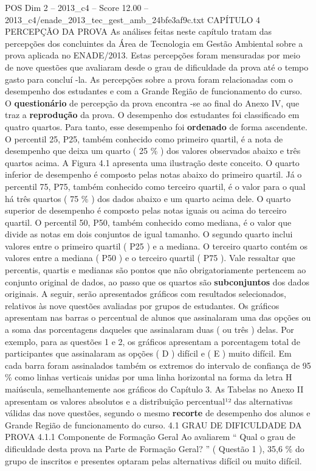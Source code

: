 \begin{textsample}{POS Dim 2 – 2013\_c4 – Score 12.00 – 2013\_c4/enade\_2013\_tec\_gest\_amb\_24bfe3af9c.txt}  \label{ex:f2_pos_067}
CAPÍTULO 4 PERCEPÇÃO DA PROVA As análises feitas neste capítulo tratam das percepções dos concluintes da Área de Tecnologia em Gestão Ambiental sobre a prova aplicada no ENADE/2013.
Estas percepções foram mensuradas por meio de nove questões que avaliaram desde o grau de dificuldade da prova até o tempo gasto para concluí -la.
As percepções sobre a prova foram relacionadas com o desempenho dos estudantes e com a Grande Região de funcionamento do curso.
O \textbf{questionário} de percepção da prova encontra -se ao final do Anexo IV, que traz a \textbf{reprodução} da prova.
O desempenho dos estudantes foi classificado em quatro quartos.
Para tanto, esse desempenho foi \textbf{ordenado} de forma ascendente.
O percentil 25, P25, também conhecido como primeiro quartil, é a nota de desempenho que deixa um quarto ( 25 \% ) dos valores observados abaixo e três quartos acima.
A Figura 4.1 apresenta uma ilustração deste conceito.
O quarto inferior de desempenho é composto pelas notas abaixo do primeiro quartil.
Já o percentil 75, P75, também conhecido como terceiro quartil, é o valor para o qual há três quartos ( 75 \% ) dos dados abaixo e um quarto acima dele.
O quarto superior de desempenho é composto pelas notas iguais ou acima do terceiro quartil.
O percentil 50, P50, também conhecido como mediana, é o valor que divide as notas em dois conjuntos de igual tamanho.
O segundo quarto inclui valores entre o primeiro quartil ( P25 ) e a mediana.
O terceiro quarto contém os valores entre a mediana ( P50 ) e o terceiro quartil ( P75 ).
Vale ressaltar que percentis, quartis e medianas são pontos que não obrigatoriamente pertencem ao conjunto original de dados, ao passo que os quartos são \textbf{subconjuntos} dos dados originais.
A seguir, serão apresentados gráficos com resultados selecionados, relativos às nove questões avaliadas por grupos de estudantes.
Os gráficos apresentam nas barras o percentual de alunos que assinalaram uma das opções ou a soma das porcentagens daqueles que assinalaram duas ( ou três ) delas.
Por exemplo, para as questões 1 e 2, os gráficos apresentam a porcentagem total de participantes que assinalaram as opções ( D ) difícil e ( E ) muito difícil.
Em cada barra foram assinalados também os extremos do intervalo de confiança de 95 \% como linhas verticais unidas por uma linha horizontal na forma da letra H maiúscula, semelhantemente aos gráficos do Capítulo 3.
As Tabelas no Anexo II apresentam os valores absolutos e a distribuição percentual¹² das alternativas válidas das nove questões, segundo o mesmo \textbf{recorte} de desempenho dos alunos e Grande Região de funcionamento do curso. 4.1 GRAU DE DIFICULDADE DA PROVA 4.1.1 Componente de Formação Geral Ao avaliarem “ Qual o grau de dificuldade desta prova na Parte de Formação Geral? ” ( Questão 1 ), 35,6 \% do grupo de inscritos e presentes optaram pelas alternativas difícil ou muito difícil.

\end{textsample}
